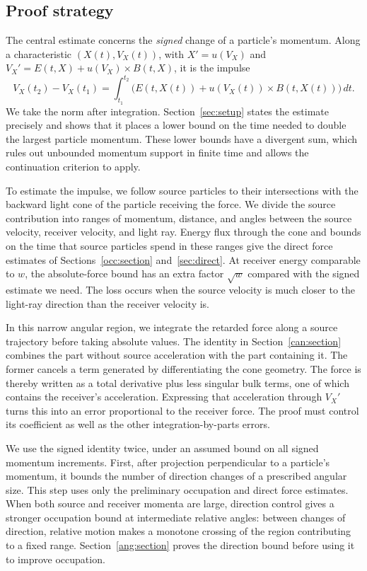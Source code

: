 \subsection{Proof strategy}
The central estimate concerns the \emph{signed} change of a particle's
momentum. Along a characteristic $(X(t),V_X(t))$, with
$X'=u(V_X)$ and $V_X'=E(t,X)+u(V_X)\times B(t,X)$, it is the impulse
\[
 V_X(t_2)-V_X(t_1)
 =\int_{t_1}^{t_2}
   \bigl(E(t,X(t))+u(V_X(t))\times B(t,X(t))\bigr)\,dt.
\]
We take the norm after integration. Section~\ref{sec:setup} states the
estimate precisely and shows that it places a lower bound on the time
needed to double the largest particle momentum. These lower bounds have
a divergent sum, which rules out unbounded momentum support in finite
time and allows the continuation criterion to apply.

To estimate the impulse, we follow source particles to their intersections
with the backward light cone of the particle receiving the force.
We divide the source contribution into ranges of momentum, distance, and
angles between the source velocity, receiver velocity, and light ray.
Energy flux through the cone and bounds on the time that source particles
spend in these ranges give the direct force estimates of
Sections~\ref{occ:section} and~\ref{sec:direct}.
At receiver energy comparable to $w$, the absolute-force bound has an
extra factor $\sqrt w$ compared with the signed estimate we need.
The loss occurs when the source velocity is much closer to the light-ray
direction than the receiver velocity is.

In this narrow angular region, we integrate the retarded force along a
source trajectory before taking absolute values.
The identity in Section~\ref{can:section} combines the part without
source acceleration with the part containing it.
The former cancels a term generated by differentiating the cone geometry.
The force is thereby written as a total derivative plus less singular
bulk terms, one of which contains the receiver's acceleration. Expressing
that acceleration through $V_X'$ turns this into an error proportional
to the receiver force. The proof must control its coefficient as well
as the other integration-by-parts errors.

We use the signed identity twice, under an assumed bound on all signed
momentum increments. First, after projection perpendicular to a particle's
momentum, it bounds the number of direction changes of a prescribed
angular size.
This step uses only the preliminary occupation and direct force estimates.
When both source and receiver momenta are large, direction control gives
a stronger occupation bound at intermediate relative angles: between
changes of direction, relative motion makes a monotone crossing of the
region contributing to a fixed range.
Section~\ref{ang:section} proves the direction bound before using it to
improve occupation.

